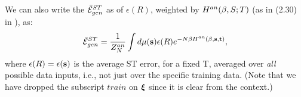 We can also write the \ModelGeneralizationError $\bar{\mathcal{E}}^{ST}_{gen}$  as \BoltzmannWeightedAverage
of $\epsilon(R)$, weighted by $H^{an}(\beta,S;T)$ (as in (2.30) in \cite{SST92}), as:
\begin{align}
\label{eqn:EgCanonical}
\bar{\mathcal{E}}^{ST}_{gen}=\dfrac{1}{Z^{an}_{N}}\int d\mu({\mathbf{s}})\epsilon(R)e^{-N\beta H^{an}(\beta,{\mathbf{s}},{\mathbf{t}})} ,
\end{align}
where $\epsilon(R)=\epsilon({\mathbf{s}})$ is the average ST error, for a fixed \Teacher T,
averaged over \emph{all} possible data inputs, i.e., not just over the specific training data.
(Note that we have dropped the subscript $train$ on $\boldsymbol{\xi}$ since it is clear from the context.)






